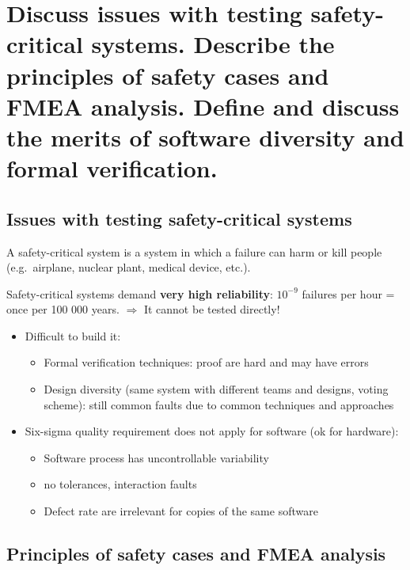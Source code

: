 \clearpage{}
\section{Discuss issues with testing safety-critical systems. Describe the
principles of safety cases and FMEA analysis. Define and discuss the merits
of software diversity and formal verification.}


\subsection{Issues with testing safety-critical systems}

A safety-critical system is a system in which a failure can harm or kill
people (e.g.\ airplane, nuclear plant, medical device, etc.). \newline

Safety-critical systems demand \textbf{very high reliability}:
${10}^{-9}$ failures per hour = once per 100 000 years. 
$\Rightarrow$ It cannot be tested directly!

\begin{itemize}
    \item Difficult to build it:
        \begin{itemize}
            \item Formal verification techniques: proof are hard and
                may have errors
            \item Design diversity (same system with different teams
                and designs, voting scheme): still common faults due
                to common techniques and approaches
        \end{itemize}

    \item Six-sigma quality requirement does not apply for software (ok
        for hardware): 
        \begin{itemize}
            \item Software process has uncontrollable variability 
            \item no tolerances, interaction faults
            \item Defect rate are irrelevant for copies of the
                same software
        \end{itemize}
\end{itemize}


\subsection{Principles of safety cases and FMEA analysis}

